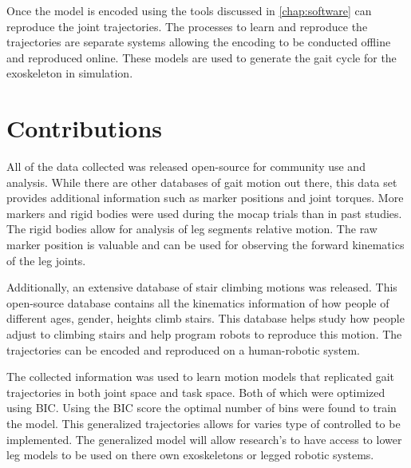 Once the model is encoded using the tools discussed in \autoref{chap:software} can reproduce the joint trajectories. The processes to learn and reproduce the trajectories are separate systems allowing the encoding to be conducted offline and reproduced online. These models are used to generate the gait cycle for the exoskeleton in simulation. 


\section{Contributions}

All of the data collected was released open-source for community use and analysis. While there are other databases of gait motion out there, this data set provides additional information such as marker positions and joint torques. More markers and rigid bodies were used during the mocap trials than in past studies. The rigid bodies allow for analysis of leg segments relative motion. The raw marker position is valuable and can be used for observing the forward kinematics of the leg joints. 

Additionally, an extensive database of stair climbing motions was released. This open-source database contains all the kinematics information of how people of different ages, gender, heights climb stairs. This database helps study how people adjust to climbing stairs and help program robots to reproduce this motion. The trajectories can be encoded and reproduced on a human-robotic system. 

The collected information was used to learn motion models that replicated gait trajectories in both joint space and task space. Both of which were optimized using BIC. Using the BIC score the optimal number of bins were found to train the model. This generalized trajectories allows for varies type of controlled to be implemented. The generalized model will allow research's to have access to lower leg models to be used on there own exoskeletons or legged robotic systems. 